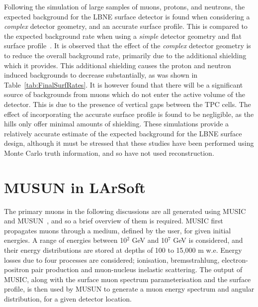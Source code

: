 Following the simulation of large samples of muons, protons, and neutrons, the expected background for the LBNE surface detector is found when considering a \emph{complex} detector geometry, and an accurate surface profile. This is compared to the expected background rate when using a \emph{simple} detector geometry and flat surface profile~\citep{MartinsThesis}. It is observed that the effect of the \emph{complex} detector geometry is to reduce the overall background rate, primarily due to the additional shielding which it provides. This additional shielding causes the proton and neutron induced backgrounds to decrease substantially, as was shown in Table~\ref{tab:FinalSurfRates}. It is however found that there will be a significant source of backgrounds from muons which do not enter the active volume of the detector. This is due to the presence of vertical gaps between the TPC cells. The effect of incorporating the accurate surface profile is found to be negligible, as the hills only offer minimal amounts of shielding. These simulations provide a relatively accurate estimate of the expected background for the LBNE surface design, although it must be stressed that these studies have been performed using Monte Carlo truth information, and so have not used reconstruction. \\

\section{MUSUN in LArSoft} \label{sec:FDIncorporation}  %
The primary muons in the following discussions are all generated using MUSIC~\citep{MUSUN, MUSIC, MUSIC2} and MUSUN~\citep{MUSUN, MUSUN2}, and so a brief overview of them is required. MUSIC first propagates muons through a medium, defined by the user, for given initial energies. A range of energies between 10$^2$ GeV and 10$^7$ GeV is considered, and their energy distributions are stored at depths of 100 to 15,000 m w.e. Energy losses due to four processes are considered; ionisation, bremsstrahlung, electron-positron pair production and muon-nucleus inelastic scattering. The output of MUSIC, along with the surface muon spectrum parameterisation and the surface profile, is then used by MUSUN to generate a muon energy spectrum and angular distribution, for a given detector location. \\


